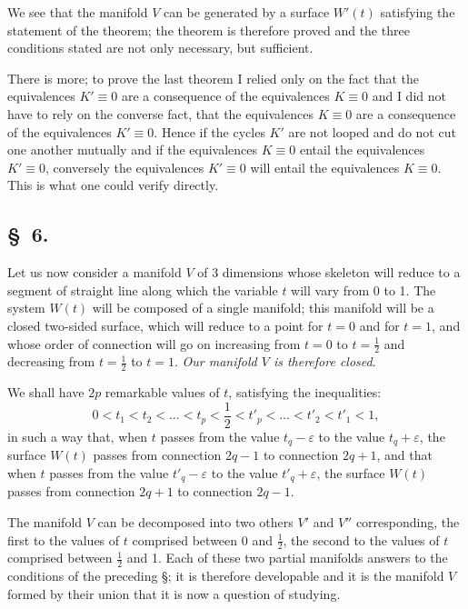 \documentclass{article}
\begin{document}
We see that the manifold $V$ can be generated by a surface $W'(t)$ satisfying the statement of the theorem; the theorem is therefore proved and the three conditions stated are not only necessary, but sufficient.

There is more; to prove the last theorem I relied only on the fact that the equivalences $K' \equiv 0$ are a consequence of the equivalences $K \equiv 0$ and I did not have to rely on the converse fact, that the equivalences $K \equiv 0$ are a consequence of the equivalences $K' \equiv 0$. Hence if the cycles $K'$ are not looped and do not cut one another mutually and if the equivalences $K \equiv 0$ entail the equivalences $K' \equiv 0$, conversely the equivalences $K' \equiv 0$ will entail the equivalences $K \equiv 0$. This is what one could verify directly.


\subsection*{\S~6.}

Let us now consider a manifold $V$ of 3 dimensions whose skeleton will reduce to a segment of straight line along which the variable $t$ will vary from 0 to 1. The system $W(t)$ will be composed of a single manifold; this manifold will be a closed two-sided surface, which will reduce to a point for $t = 0$ and for $t = 1$, and whose order of connection will go on increasing from $t = 0$ to $t = \frac{1}{2}$ and decreasing from $t = \frac{1}{2}$ to $t = 1$. \emph{Our manifold $V$ is therefore closed}.

We shall have $2p$ remarkable values of $t$, satisfying the inequalities:
\[ 0 < t_{1} < t_{2} < \ldots < t_{p} < \frac{1}{2} < t'_{p} < \ldots < t'_{2} < t'_{1} < 1, \]
in such a way that, when $t$ passes from the value $t_{q} - \varepsilon$ to the value $t_{q} + \varepsilon$, the surface $W(t)$ passes from connection $2q - 1$ to connection $2q + 1$, and that when $t$ passes from the value $t'_{q} - \varepsilon$ to the value $t'_{q} + \varepsilon$, the surface $W(t)$ passes from connection $2q + 1$ to connection $2q - 1$.

The manifold $V$ can be decomposed into two others $V'$ and $V''$ corresponding, the first to the values of $t$ comprised between 0 and $\frac{1}{2}$, the second to the values of $t$ comprised between $\frac{1}{2}$ and 1. Each of these two partial manifolds answers to the conditions of the preceding \S; it is therefore developable and it is the manifold $V$ formed by their union that it is now a question of studying.
\end{document}
